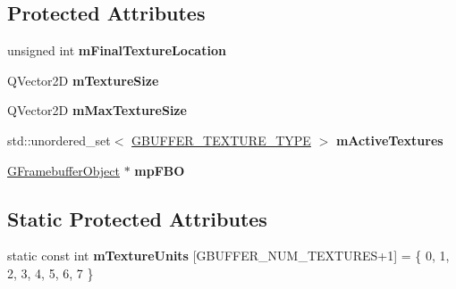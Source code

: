 \subsection*{Protected Attributes}
\begin{DoxyCompactItemize}
\item 
\mbox{\label{class_geometry_engine_1_1_geometry_buffer_1_1_g_buffer_a6fc8627c8538eb232c21f0f23e0375d1}} 
unsigned int {\bfseries m\+Final\+Texture\+Location}
\item 
\mbox{\label{class_geometry_engine_1_1_geometry_buffer_1_1_g_buffer_a14ab02ce110b16e44ade0d2cec0a1bfe}} 
Q\+Vector2D {\bfseries m\+Texture\+Size}
\item 
\mbox{\label{class_geometry_engine_1_1_geometry_buffer_1_1_g_buffer_a5dab69ea8f4510c241ccda6817b4af32}} 
Q\+Vector2D {\bfseries m\+Max\+Texture\+Size}
\item 
\mbox{\label{class_geometry_engine_1_1_geometry_buffer_1_1_g_buffer_ad9b17162f29ea4d0600d665bd3f7f0e3}} 
std\+::unordered\+\_\+set$<$ \mbox{\hyperlink{class_geometry_engine_1_1_geometry_buffer_1_1_g_buffer_a718dceafcac1915f7de061108597e1cc}{G\+B\+U\+F\+F\+E\+R\+\_\+\+T\+E\+X\+T\+U\+R\+E\+\_\+\+T\+Y\+PE}} $>$ {\bfseries m\+Active\+Textures}
\item 
\mbox{\label{class_geometry_engine_1_1_geometry_buffer_1_1_g_buffer_adecb16016bf50ab1f50924cee963f432}} 
\mbox{\hyperlink{class_geometry_engine_1_1_geometry_buffer_1_1_g_framebuffer_object}{G\+Framebuffer\+Object}} $\ast$ {\bfseries mp\+F\+BO}
\end{DoxyCompactItemize}
\subsection*{Static Protected Attributes}
\begin{DoxyCompactItemize}
\item 
\mbox{\label{class_geometry_engine_1_1_geometry_buffer_1_1_g_buffer_ac0644e1c1bbc64dfae4c1425c528571b}} 
static const int {\bfseries m\+Texture\+Units} \mbox{[}G\+B\+U\+F\+F\+E\+R\+\_\+\+N\+U\+M\+\_\+\+T\+E\+X\+T\+U\+R\+ES+1\mbox{]} = \{ 0, 1, 2, 3, 4, 5, 6, 7 \}
\end{DoxyCompactItemize}


